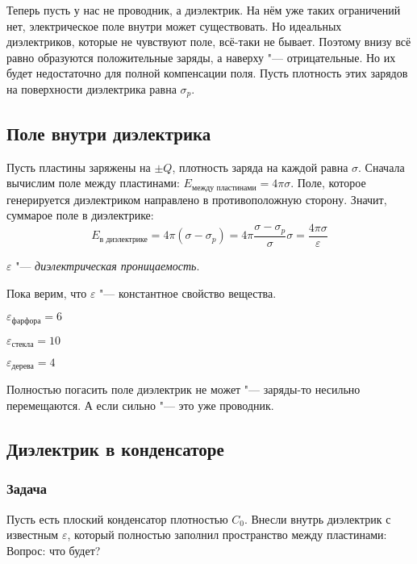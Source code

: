     Теперь пусть у нас не проводник, а диэлектрик.
    На нём уже таких ограничений нет, электрическое поле внутри может существовать.
    Но идеальных диэлектриков, которые не чувствуют поле, всё-таки не бывает.
    Поэтому внизу всё равно образуются положительные заряды, а наверху "--- отрицательные.
    Но их будет недостаточно для полной компенсации поля.
    Пусть плотность этих зарядов на поверхности диэлектрика равна $\sigma_p$.

  \subsection{Поле внутри диэлектрика}
    Пусть пластины заряжены на $\pm Q$, плотность заряда на каждой равна $\sigma$.
    Сначала вычислим поле между пластинами: $E_{\text{между пластинами}} = 4\pi \sigma$.
    Поле, которое генерируется диэлектриком направлено в противоположную сторону.
    Значит, суммарое поле в диэлектрике:
    \[ E_\text{в диэлектрике} = 4\pi(\sigma - \sigma_p)
        = 4\pi\frac{\sigma - \sigma_p}{\sigma}\sigma
        = \frac{4\pi\sigma}{\varepsilon}
    \]
    \begin{Def}
      $\varepsilon$ "--- \textit{диэлектрическая проницаемость}.
    \end{Def}
    \begin{Rem}
      Пока верим, что $\varepsilon$ "--- константное свойство вещества.
    \end{Rem}
    \begin{exmp}$\varepsilon_\text{фарфора} = 6$\end{exmp}
    \begin{exmp}$\varepsilon_\text{стекла} = 10$\end{exmp}
    \begin{exmp}$\varepsilon_\text{дерева} = 4$\end{exmp}
    \begin{Rem}
      Полностью погасить поле диэлектрик не может "--- заряды-то несильно перемещаются.
      А если сильно "--- это уже проводник.
    \end{Rem}

  \subsection{Диэлектрик в конденсаторе}
    \subsubsection{Задача}
      Пусть есть плоский конденсатор плотностью $C_0$.
      Внесли внутрь диэлектрик с известным $\varepsilon$, который полностью заполнил пространство между пластинами:
      Вопрос: что будет?

